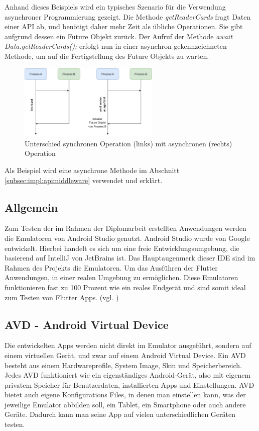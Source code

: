 Anhand dieses Beispiels wird ein typisches Szenario f\"ur die Verwendung asynchroner Programmierung gezeigt. Die Methode {\textit{getReaderCards}} fragt Daten einer API ab, und benötigt daher mehr Zeit als übliche Operationen. Sie gibt aufgrund dessen ein Future Objekt zurück. Der Aufruf der Methode {\textit{await Data.getReaderCards();}} erfolgt nun in einer asynchron gekennzeichneten Methode, um auf die Fertigstellung des Future Objekts zu warten.

\begin{figure}[h!]
\centering
\includegraphics[width=0.6\textwidth]{FLUTTER/images/GP/async.png}
\caption{Unterschied synchronen Operation (links) mit asynchronen (rechts) Operation}
\end{figure}

Als Beispiel wird eine asynchrone Methode im Abschnitt \ref{subsec:impl:apimiddleware}  verwendet und erklärt.

\newpage

\subsection{Allgemein}
Zum Testen der im Rahmen der Diplomarbeit erstellten Anwendungen werden die Emulatoren von Android Studio genutzt. Android Studio wurde von Google entwickelt. Hierbei handelt es sich um eine freie Entwicklungsumgebung, die basierend auf IntelliJ von JetBrains ist. Das Hauptaugenmerk dieser IDE sind im Rahmen des Projekts die Emulatoren. Um das Ausführen der Flutter Anwendungen, in einer realen Umgebung zu erm\"oglichen. Diese Emulatoren funktionieren fast zu 100 Prozent wie ein reales Endgerät und sind somit ideal zum Testen von Flutter Apps. (vgl.\cite{Android} \cite{Android-AVD})

\subsection{AVD - Android Virtual Device}
Die entwickelten Apps werden nicht direkt im Emulator ausgeführt, sondern auf einem virtuellen Gerät, und zwar auf einem Android Virtual Device. Ein AVD besteht aus einem Hardwareprofile, System Image, Skin und Speicherbereich. Jedes AVD funktioniert wie ein eigenständiges Android-Gerät, also mit eigenem privatem Speicher für Benutzerdaten, installierten Apps und Einstellungen. AVD bietet auch eigene Konfigurations Files, in denen man einstellen kann, was der jeweilige Emulator abbilden soll, ein Tablet, ein Smartphone oder auch andere Geräte. Dadurch kann man seine App auf vielen unterschiedlichen Geräten testen.

